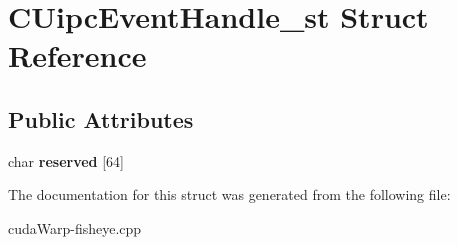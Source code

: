 \hypertarget{structCUipcEventHandle__st}{}\section{C\+Uipc\+Event\+Handle\+\_\+st Struct Reference}
\label{structCUipcEventHandle__st}
\subsection*{Public Attributes}
\begin{DoxyCompactItemize}
\item 
char {\bfseries reserved} \mbox{[}64\mbox{]}\hypertarget{structCUipcEventHandle__st_ab622474c4a052a3f9de790d7a2fb72d0}{}\label{structCUipcEventHandle__st_ab622474c4a052a3f9de790d7a2fb72d0}

\end{DoxyCompactItemize}


The documentation for this struct was generated from the following file\+:\begin{DoxyCompactItemize}
\item 
cuda\+Warp-\/fisheye.\+cpp\end{DoxyCompactItemize}

